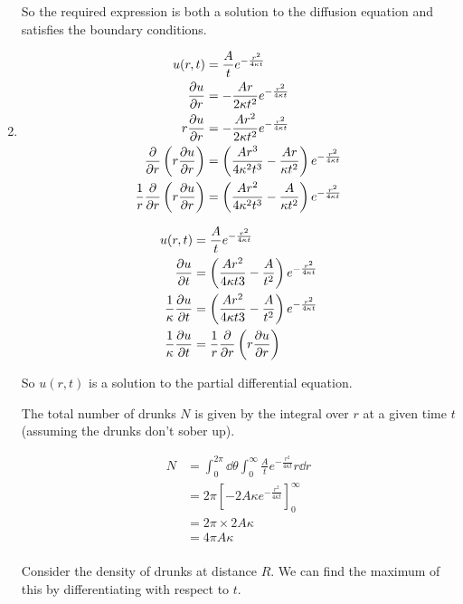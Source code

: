 \documentclass[10pt,oneside,a4paper]{article}
\begin{document}
\begin{enumerate}
So the required expression is both a solution to the diffusion equation and
satisfies the boundary conditions.

\item

\[
\begin{split}
u(r, t) &= \frac{A}{t}e^{-\frac{r^2}{4\kappa t}} \\
\pdv{u}{r} &= -\frac{Ar}{2\kappa t^2}e^{-\frac{r^2}{4\kappa t}} \\
r\pdv{u}{r} &= -\frac{Ar^2}{2\kappa t^2}e^{-\frac{r^2}{4\kappa t}} \\
\pdv{r}\left( r\pdv{u}{r} \right) &= \left(\frac{Ar^3}{4\kappa^2 t^3} - \frac{Ar}{\kappa t^2}\right)
e^{-\frac{r^2}{4\kappa t}} \\
\frac{1}{r}\pdv{r}\left( r\pdv{u}{r} \right) &= \left(\frac{Ar^2}{4\kappa^2 t^3} - \frac{A}{\kappa t^2}\right)
e^{-\frac{r^2}{4\kappa t}} \\
\end{split}
\]

\[
\begin{split}
u(r, t) &= \frac{A}{t}e^{-\frac{r^2}{4\kappa t}} \\
\pdv{u}{t} &= \left( \frac{Ar^2}{4\kappa t3} - \frac{A}{t^2}\right)e^{-\frac{r^2}{4\kappa t}} \\
\frac{1}{\kappa} \pdv{u}{t} &= \left( \frac{Ar^2}{4\kappa t3} - \frac{A}{t^2} \right)e^{-\frac{r^2}{4\kappa
t}} \\
\frac{1}{\kappa} \pdv{u}{t} &= \frac{1}{r}\pdv{r}\left( r\pdv{u}{r} \right) \\
\end{split}
\]

So $u(r, t)$ is a solution to the partial differential equation.

The total number of drunks $N$ is given by the integral over $r$ at a given time $t$ (assuming
the drunks don't sober up).

\[
\begin{split}
N &= \int^{2\pi}_{0}\dd{\theta} \int^{\infty}_{0} \frac{A}{t}e^{-\frac{r^2}{4\kappa t}} r\dd{r} \\
&= 2\pi \left[ -2A\kappa e^{-\frac{r^2}{4\kappa t}} \right]^{\infty}_0 \\
&= 2\pi \times 2A\kappa \\
&= 4\pi A \kappa \\
\end{split}
\]

Consider the density of drunks at distance $R$. We can find the maximum of this by differentiating
with respect to $t$.


\end{enumerate}
\end{document}
